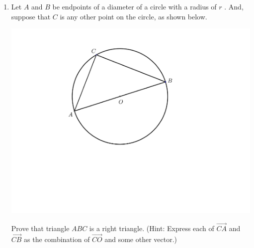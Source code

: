 \documentclass[12pt]{article}
\newif\ifans
\begin{document}
\begin{enumerate}
\ifans{\fbox{\parbox{1\linewidth}{We expand $\|{\bf v}+{\bf w}\|^2$ using properties of the dot product:
\begin{align*}
\|{\bf v}+{\bf w}\|^2&=({\bf v}+{\bf w})\cdot({\bf v}+{\bf w})\\
&={\bf v}\cdot{\bf v}+{\bf v}\cdot{\bf w}+{\bf w}\cdot{\bf v}+{\bf w}\cdot{\bf w}\\
&=\|{\bf v}\|^2+2({\bf v}\cdot {\bf w})+\|{\bf w}\|^2 \text{ (since } {\bf v}\cdot {\bf w}={\bf w}\cdot {\bf v})\\
&=\|{\bf v}\|^2+\|{\bf w}\|^2 \text{ (since }{\bf v}\perp{\bf w}\Leftrightarrow {\bf v}\cdot{\bf w}=0)
\end{align*}
Thus, $\|{\bf v}+{\bf w}\|^2=\|{\bf v}\|^2+\|{\bf w}\|^2$, as promised.
}}} \fi

\item Let $A$ and $B$ be endpoints of a diameter of a circle with a radius of $r$ .  And, suppose that $C$ is any other point on the circle, as shown below. 
\begin{center}
\includegraphics[scale=0.5]{circle.pdf}
\end{center}
 Prove that triangle $ABC$ is a right triangle.  (Hint: Express each of $\overrightarrow{CA}$ and $\overrightarrow{CB}$ as the combination of $\overrightarrow{CO}$ and some other vector.)

\ifans{\fbox{\parbox{1\linewidth}{Notice that ${\bf CA}={\bf CO}+{\bf OA}$ and ${\bf CB}={\bf CO}+{\bf OB}$.  But, ${\bf OB}=-{\bf OA}$.  Thus, ${\bf CB}={\bf CO}-{\bf OA}$.  We will show that ${\bf CA} \perp {\bf CB}$ by showing that ${\bf CA} \cdot {\bf CB}=0$.
\begin{align*}
{\bf CA}\cdot {\bf CB}&=\left({\bf CO}+{\bf OA}\right) \cdot \left({\bf CO}-{\bf OA}\right)\\
&= {\bf CO}\cdot{\bf CO}-{\bf CO}\cdot {\bf OA}+{\bf OA}\cdot{\bf CO}-{\bf OA}\cdot{\bf OA}\\
&=\|{\bf CO}\|^2-\|{\bf OA}\|^2\\
&=r^2-r^2\\
&=0
\end{align*}
So, ${\bf CA}\perp{\bf CB}$ and the triangle is a right triangle.
}}} \fi


\end{enumerate}
\end{document}
